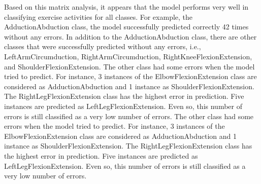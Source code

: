 Based on this matrix analysis, it appears that the model performs very well in classifying exercise activities for all classes. For example, the AdductionAbduction class, the model successfully predicted correctly 42 times without any errors. In addition to the AdductionAbduction class, there are other classes that were successfully predicted without any errors, i.e., LeftArmCircumduction, RightArmCircumduction, RightKneeFlexionExtension, and ShoulderFlexionExtension. The other class had some errors when the model tried to predict. For instance, 3 instances of the ElbowFlexionExtension class are considered as AdductionAbduction and 1 instance as ShoulderFlexionExtension. The RightLegFlexionExtension class has the highest error in prediction. Five instances are predicted as LeftLegFlexionExtension. Even so, this number of errors is still classified as a very low number of errors. The other class had some errors when the model tried to predict. For instance, 3 instances of the ElbowFlexionExtension class are considered as AdductionAbduction and 1 instance as ShoulderFlexionExtension. The RightLegFlexionExtension class has the highest error in prediction. Five instances are predicted as LeftLegFlexionExtension. Even so, this number of errors is still classified as a very low number of errors.

